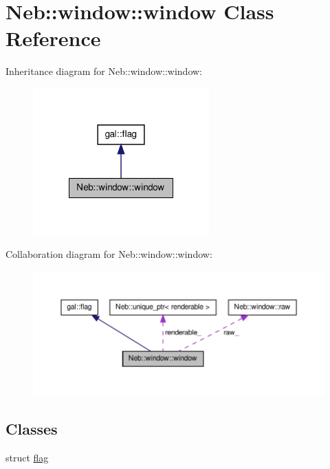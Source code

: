 \hypertarget{classNeb_1_1window_1_1window}{\section{\-Neb\-:\-:window\-:\-:window \-Class \-Reference}
\label{classNeb_1_1window_1_1window}
}


\-Inheritance diagram for \-Neb\-:\-:window\-:\-:window\-:\nopagebreak
\begin{figure}[H]
\begin{center}
\leavevmode
\includegraphics[width=192pt]{classNeb_1_1window_1_1window__inherit__graph}
\end{center}
\end{figure}


\-Collaboration diagram for \-Neb\-:\-:window\-:\-:window\-:\nopagebreak
\begin{figure}[H]
\begin{center}
\leavevmode
\includegraphics[width=350pt]{classNeb_1_1window_1_1window__coll__graph}
\end{center}
\end{figure}
\subsection*{\-Classes}
\begin{DoxyCompactItemize}
\item 
struct \hyperlink{structNeb_1_1window_1_1window_1_1flag}{flag}
\end{DoxyCompactItemize}
